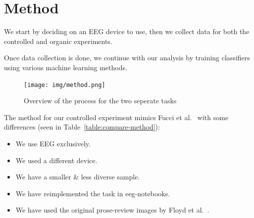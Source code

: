 \chapter{Method}

We start by deciding on an EEG device to use, then we collect data for both the controlled and organic experiments.

Once data collection is done, we continue with our analysis by training classifiers using various machine learning methods.

\begin{figure}[h]
    \begin{center}
        \texttt{[image: img/method.png]}
    \end{center}
    \caption{Overview of the process for the two seperate tasks}\label{fig:method}
\end{figure}

The method for our controlled experiment mimics Fucci et al.~\cite{fucci_replication_2019} with some differences (seen in Table~\ref{table:compare-method}): 

\begin{itemize}
        \item We use EEG exclusively.
        \item We used a different device.
        \item We have a smaller \& less diverse sample.
        \item We have reimplemented the task in eeg-notebooks.
        \item We have used the original prose-review images by Floyd et al.~\cite{floyd_decoding_2017}.
\end{itemize}


